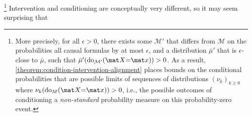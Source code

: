     \unskip\footnote{More precisely, 
    for all $\epsilon > 0$, there exists some $\mathcal M'$ that differs from $\mathcal M$ on the probabilities all causal formulas by at most $\epsilon$, and a distribution $\bar\mu'$ that is $\epsilon$-close to $\bar\mu$, such that $\bar\mu'(\mathrm{do}_{\mathcal M'}(\mat X{=}\mat x))>0$.
     As a result, \cref{theorem:condition-intervention-alignment} places bounds on the conditional probabilities that are possible limits of sequences of distributions $(\nu_k)_{k\ge 0}$ where $\nu_k(\mathrm{do}_M(\mat X{=}\mat x)) > 0$, i.e., the 
     possible outcomes of conditioning a \emph{non-standard} probability measure
        \citep{halpern-RAU}
     on this probability-zero event.
    } %
%
Intervention and conditioning are conceptually very different, so
it may seem surprising that
